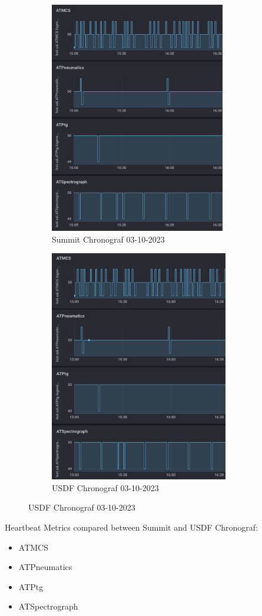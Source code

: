 \newpage
\begin{figure}
\centering
\begin{subfigure}{.5\textwidth}
  \centering
  \includegraphics[height=4in]{images/Summit_2.png}
  \caption{Summit Chronograf 03-10-2023}
  \label{fig:sub3}
\end{subfigure}%
\begin{subfigure}{.5\textwidth}
  \centering
  \includegraphics[height=4in]{images/USDF_2.png}
  \caption{USDF Chronograf 03-10-2023}
  \label{fig:sub4}
\end{subfigure}
\label{fig:image2}
\end{figure}
Heartbeat Metrics compared between Summit and USDF Chronograf:
\begin{itemize}
  \item ATMCS
  \item ATPneumatics
  \item ATPtg
  \item ATSpectrograph
\end{itemize}

